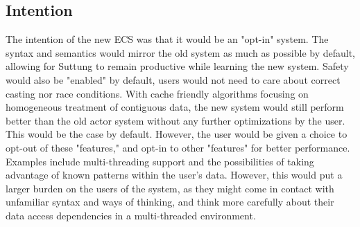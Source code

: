 \subsection{Intention}
\label{subsec:high_level_intention}
The intention of the new ECS was that it would be an "opt-in" system.
The syntax and semantics would mirror the old system as much as possible by default, allowing for Suttung to remain productive while learning the new system.
Safety would also be "enabled" by default, users would not need to care about correct casting nor race conditions.
With cache friendly algorithms focusing on homogeneous treatment of contiguous data,
the new system would still perform better than the old actor system without any further optimizations by the user.
This would be the case by default. 
However, the user would be given a choice to opt-out of these "features," and opt-in to other "features" for better performance.
Examples include multi-threading support and the possibilities of taking advantage of known patterns within the user's data.
However, this would put a larger burden on the users of the system, as they might come in contact with unfamiliar syntax and ways of thinking, and think more carefully about their data access dependencies in a multi-threaded environment.


